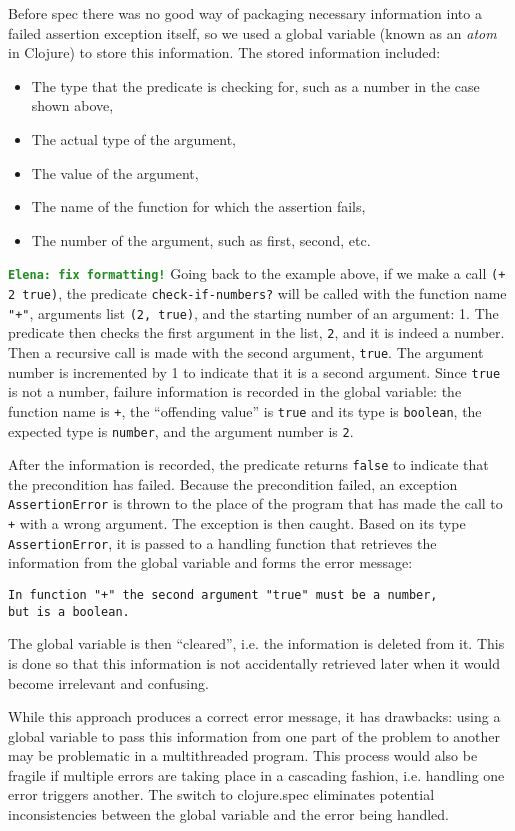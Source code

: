 \documentclass[12pt]{article}
\newcommand{\comment}[1]{{\bf \tt  {#1}}}
\newcommand{\emcomment}[1]{\textcolor{ForestGreen}{\comment{Elena: {#1}}}}
\begin{document}
Before spec there was no good way of packaging necessary information into a failed assertion 
exception itself, so we used a global variable (known as an {\it atom} in Clojure) to store this
information. The stored information included:
\begin{itemize}
\item The type that the predicate is checking for, such as a number in the case shown above,
\item The actual type of the argument,
\item The value of the argument,
\item The name of the function for which the assertion fails,
\item The number of the argument, such as first, second, etc. 
\end{itemize}
\emcomment{fix formatting!}
Going back to the example above, if we make a call {\tt (+ 2 true)}, the predicate 
{\tt check-if-numbers?} will be called with the function name {\tt "+"}, arguments list
{\tt (2, true)}, and the starting number of an argument: 1.   
The predicate then checks the first argument in the list, {\tt 2}, and it is indeed a number. 
Then a recursive call is made with the second argument, {\tt true}. The argument number is 
incremented by 1 to indicate that it is a second argument. Since {\tt true} is not a number,
failure information is recorded in the global variable: the function name is {\tt +}, the ``offending
value'' is {\tt true} and its type is {\tt boolean}, the expected type is {\tt number}, and the argument 
number is {\tt 2}. 

After the information is recorded, the predicate returns {\tt false} to indicate that the precondition 
has failed. Because the precondition failed, an exception {\tt AssertionError} is thrown to the 
place of the program that has made the call to {\tt +} with a wrong argument. 
The exception is then caught. Based on  its type {\tt AssertionError}, it is passed to a handling function 
that retrieves the information from the global variable and forms the error message:
\begin{verbatim}
In function "+" the second argument "true" must be a number, 
but is a boolean. 
\end{verbatim} 
The global variable is then ``cleared'', i.e. the information is deleted from it. This is done so that this 
information is not accidentally retrieved later when it would become irrelevant and confusing. 

While this approach produces a correct error message, it has drawbacks: using a global variable to
pass this information from one part of the problem to another may be problematic in a multithreaded 
program. This process would also be fragile if multiple errors are taking place in a cascading fashion,
i.e. handling one error triggers another. The switch to clojure.spec eliminates potential inconsistencies 
between the global variable and the error being handled. 
\end{document}
